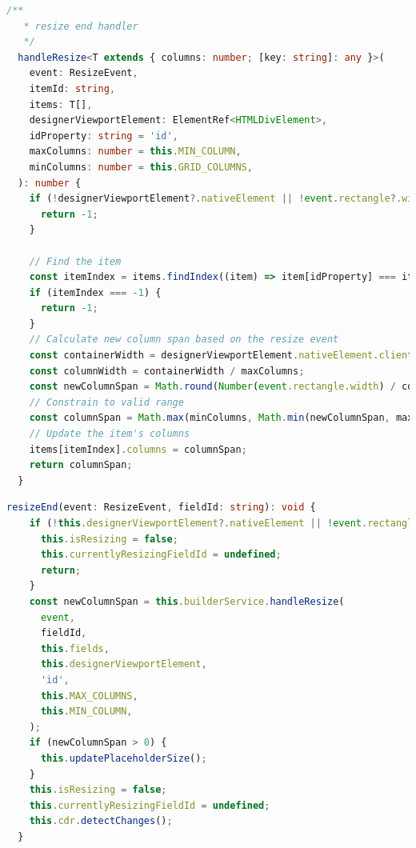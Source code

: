 \documentclass[a4paper,11pt]{article}
\begin{document}
\newpage
\renewcommand{\lstlistingname}{\texttt{Resize Function in Builder Service}}
\begin{lstlisting}[language=TypeScript, caption={\texttt{handleSimpleDrop} function}]
 /**
   * resize end handler
   */
  handleResize<T extends { columns: number; [key: string]: any }>(
    event: ResizeEvent,
    itemId: string,
    items: T[],
    designerViewportElement: ElementRef<HTMLDivElement>,
    idProperty: string = 'id',
    maxColumns: number = this.MIN_COLUMN,
    minColumns: number = this.GRID_COLUMNS,
  ): number {
    if (!designerViewportElement?.nativeElement || !event.rectangle?.width) {
      return -1;
    }

    // Find the item
    const itemIndex = items.findIndex((item) => item[idProperty] === itemId);
    if (itemIndex === -1) {
      return -1;
    }
    // Calculate new column span based on the resize event
    const containerWidth = designerViewportElement.nativeElement.clientWidth;
    const columnWidth = containerWidth / maxColumns;
    const newColumnSpan = Math.round(Number(event.rectangle.width) / columnWidth);
    // Constrain to valid range
    const columnSpan = Math.max(minColumns, Math.min(newColumnSpan, maxColumns));
    // Update the item's columns
    items[itemIndex].columns = columnSpan;
    return columnSpan;
  }
\end{lstlisting}

\renewcommand{\lstlistingname}{\texttt{Aufruf von handleResize in Canvas Kompopnente}}
\begin{lstlisting}[language=TypeScript, caption={\texttt{handleSimpleDrop} function}]
  resizeEnd(event: ResizeEvent, fieldId: string): void {
    if (!this.designerViewportElement?.nativeElement || !event.rectangle?.width) {
      this.isResizing = false;
      this.currentlyResizingFieldId = undefined;
      return;
    }
    const newColumnSpan = this.builderService.handleResize(
      event,
      fieldId,
      this.fields,
      this.designerViewportElement,
      'id',
      this.MAX_COLUMNS,
      this.MIN_COLUMN,
    );
    if (newColumnSpan > 0) {
      this.updatePlaceholderSize();
    }
    this.isResizing = false;
    this.currentlyResizingFieldId = undefined;
    this.cdr.detectChanges();
  }
\end{lstlisting}





\newpage
\end{document}
